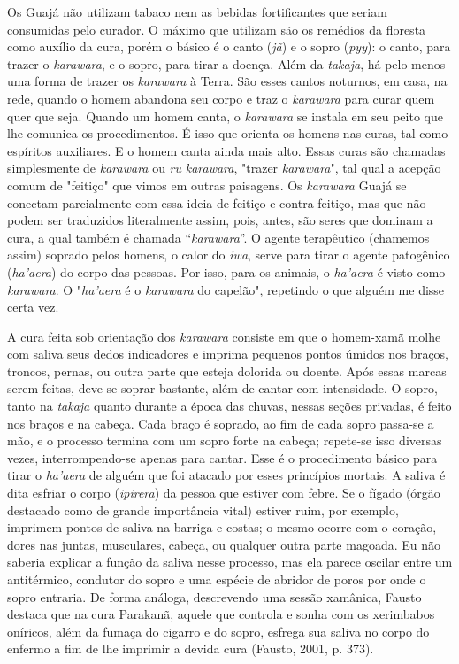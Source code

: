 Os Guajá não utilizam tabaco nem as bebidas fortificantes que seriam
consumidas pelo curador. O máximo que utilizam são os remédios da
floresta como auxílio da cura, porém o básico é o canto (\emph{jã}) e o
sopro (\emph{pyy}): o canto, para trazer o \emph{karawara}, e o sopro,
para tirar a doença. Além da \emph{takaja}, há pelo menos uma forma de
trazer os \emph{karawara} à Terra. São esses cantos noturnos, em casa,
na rede, quando o homem abandona seu corpo e traz o \emph{karawara} para
curar quem quer que seja. Quando um homem canta, o \emph{karawara} se
instala em seu peito que lhe comunica os procedimentos. É isso que
orienta os homens nas curas, tal como espíritos auxiliares. E o homem
canta ainda mais alto. Essas curas são chamadas simplesmente de
\emph{karawara} ou \emph{ru} \emph{karawara}, "trazer \emph{karawara}",
tal qual a acepção comum de "feitiço" que vimos em outras paisagens. Os
\emph{karawara} Guajá se conectam parcialmente com essa ideia de feitiço
e contra-feitiço, mas que não podem ser traduzidos literalmente assim,
pois, antes, são seres que dominam a cura, a qual também é chamada
``\emph{karawara}''. O agente terapêutico (chamemos assim) soprado pelos
homens, o calor do \emph{iwa}, serve para tirar o agente patogênico
(\emph{ha'aera}) do corpo das pessoas. Por isso, para os animais, o
\emph{ha'aera} é visto como \emph{karawara}. O "\emph{ha'aera} é o
\emph{karawara} do capelão", repetindo o que alguém me disse certa vez.

A cura feita sob orientação dos \emph{karawara} consiste em que o
homem-xamã molhe com saliva seus dedos indicadores e imprima pequenos
pontos úmidos nos braços, troncos, pernas, ou outra parte que esteja
dolorida ou doente. Após essas marcas serem feitas, deve-se soprar
bastante, além de cantar com intensidade. O sopro, tanto na
\emph{takaja} quanto durante a época das chuvas, nessas seções privadas,
é feito nos braços e na cabeça. Cada braço é soprado, ao fim de cada
sopro passa-se a mão, e o processo termina com um sopro forte na cabeça;
repete-se isso diversas vezes, interrompendo-se apenas para cantar. Esse
é o procedimento básico para tirar o \emph{ha'aera} de alguém que foi
atacado por esses princípios mortais. A saliva é dita esfriar o corpo
(\emph{ipirera}) da pessoa que estiver com febre. Se o fígado (órgão
destacado como de grande importância vital) estiver ruim, por exemplo,
imprimem pontos de saliva na barriga e costas; o mesmo ocorre com o
coração, dores nas juntas, musculares, cabeça, ou qualquer outra parte
magoada. Eu não saberia explicar a função da saliva nesse processo, mas
ela parece oscilar entre um antitérmico, condutor do sopro e uma espécie
de abridor de poros por onde o sopro entraria. De forma análoga,
descrevendo uma sessão xamânica, Fausto destaca que na cura Parakanã,
aquele que controla e sonha com os xerimbabos oníricos, além da fumaça
do cigarro e do sopro, esfrega sua saliva no corpo do enfermo a fim de
lhe imprimir a devida cura (Fausto, 2001, p. 373).

